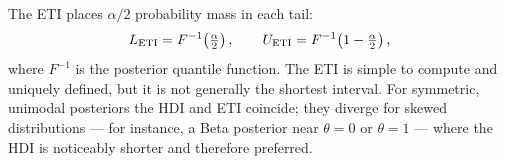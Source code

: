 The ETI places $\alpha/2$ probability mass in each tail:
\begin{equation}\label{eq:eti}
  L_{\rm ETI} = F^{-1}\!\left(\tfrac{\alpha}{2}\right), \qquad
  U_{\rm ETI} = F^{-1}\!\left(1 - \tfrac{\alpha}{2}\right),
\end{equation}
where $F^{-1}$ is the posterior quantile function. The ETI is simple to compute and
uniquely defined, but it is not generally the shortest interval.
For symmetric, unimodal posteriors the HDI and ETI coincide; they diverge for skewed
distributions --- for instance, a Beta posterior near $\theta = 0$ or $\theta = 1$ ---
where the HDI is noticeably shorter and therefore preferred.

%
%

